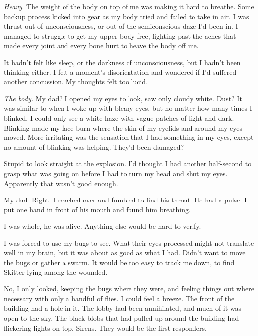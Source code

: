 





\emph{Heavy}.  The weight of the body on top of me was making it hard to breathe.  Some backup process kicked into gear as my body tried and failed to take in air.  I was thrust out of unconsciousness, or out of the semiconscious daze I'd been in.  I managed to struggle to get my upper body free, fighting past the aches that made every joint and every bone hurt to heave the body off me.



It hadn't felt like sleep, or the darkness of unconsciousness, but I hadn't been thinking either.  I felt a moment's disorientation and wondered if I'd suffered another concussion.  My thoughts felt too lucid.



\emph{The body.}  My dad?  I opened my eyes to look, saw only cloudy white.  Dust?  It was similar to when I woke up with bleary eyes, but no matter how many times I blinked, I could only see a white haze with vague patches of light and dark.  Blinking made my face burn where the skin of my eyelids and around my eyes moved.  More irritating was the sensation that I had something in my eyes, except no amount of blinking was helping.  They'd been damaged?



Stupid to look straight at the explosion.  I'd thought I had another half-second to grasp what was going on before I had to turn my head and shut my eyes.  Apparently that wasn't good enough.



My dad.  Right.  I reached over and fumbled to find his throat.  He had a pulse.  I put one hand in front of his mouth and found him breathing.



I was whole, he was alive.  Anything else would be hard to verify.



I was forced to use my bugs to see.  What their eyes processed might not translate well in my brain, but it was about as good as what I had.  Didn't want to move the bugs or gather a swarm.  It would be too easy to track me down, to find Skitter lying among the wounded.



No, I only looked, keeping the bugs where they were, and feeling things out where necessary with only a handful of flies.  I could feel a breeze.  The front of the building had a hole in it.  The lobby had been annihilated, and much of it was open to the sky.  The black blobs that had pulled up around the building had flickering lights on top.  Sirens.  They would be the first responders.



